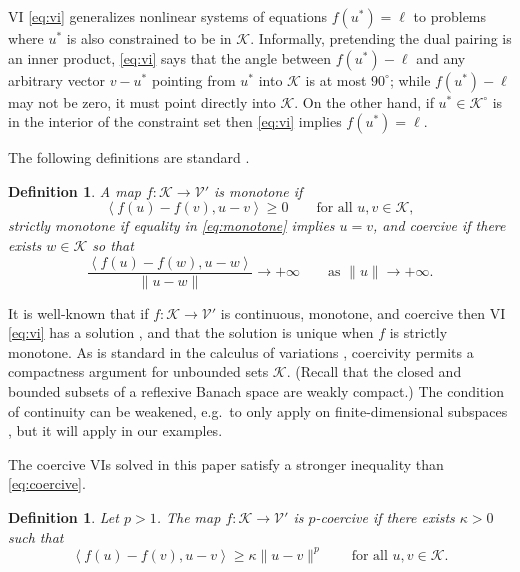 \documentclass[letterpaper,final,12pt,reqno]{amsart}
\theoremstyle{cstyle}
\theoremstyle{cstyle*}
\theoremstyle{dstyle}
\newtheorem{definition}[theorem]{Definition}
\numberwithin{equation}{section}
\numberwithin{figure}{section}
\numberwithin{table}{section}
\numberwithin{theorem}{section}
\newcommand{\cK}{\mathcal{K}}
\newcommand{\cV}{\mathcal{V}}
\newcommand{\ip}[2]{\left<#1,#2\right>}
\begin{document}
VI \eqref{eq:vi} generalizes nonlinear systems of equations $f(u^*)=\ell$ to problems where $u^*$ is also constrained to be in $\cK$.  Informally, pretending the dual pairing is an inner product, \eqref{eq:vi} says that the angle between $f(u^*)-\ell$ and any arbitrary vector $v-u^*$ pointing from $u^*$ into $\cK$ is at most $90^\circ$; while $f(u^*)-\ell$ may not be zero, it must point directly into $\cK$.  On the other hand, if $u^*\in\cK^\circ$ is in the interior of the constraint set then \eqref{eq:vi} implies $f(u^*)=\ell$.

The following definitions are standard \cite{KinderlehrerStampacchia1980}.

\begin{definition}  A map $f:\cK \to \cV'$ is \emph{monotone} if
\begin{equation}
\ip{f(u)-f(v)}{u-v} \ge 0 \qquad \text{for all } u,v \in \cK, \label{eq:monotone}
\end{equation}
\emph{strictly monotone} if equality in \eqref{eq:monotone} implies $u=v$, and \emph{coercive} if there exists $w \in \cK$ so that
\begin{equation}
\frac{\ip{f(u)-f(w)}{u-w}}{\|u-w\|} \to +\infty \qquad \text{as } \|u\|\to +\infty. \label{eq:coercive}
\end{equation}
\end{definition}

It is well-known that if $f:\cK \to \cV'$ is continuous, monotone, and coercive then VI \eqref{eq:vi} has a solution \cite[Corollary III.1.8]{KinderlehrerStampacchia1980}, and that the solution is unique when $f$ is strictly monotone.  As is standard in the calculus of variations \cite{Evans2010}, coercivity permits a compactness argument for unbounded sets $\cK$.  (Recall that the closed and bounded subsets of a reflexive Banach space are weakly compact.)  The condition of continuity can be weakened, e.g.~to only apply on finite-dimensional subspaces \cite{KinderlehrerStampacchia1980}, but it will apply in our examples.

The coercive VIs solved in this paper satisfy a stronger inequality than \eqref{eq:coercive}.

\begin{definition}  Let $p>1$.  The map $f:\cK \to \cV'$ is \emph{$p$-coercive} if there exists $\kappa>0$ such that
\begin{equation}
\ip{f(u)-f(v)}{u-v} \ge \kappa \|u-v\|^p \qquad \text{for all } u,v \in \cK. \label{eq:pcoercive}
\end{equation}
\end{definition}
\end{document}
